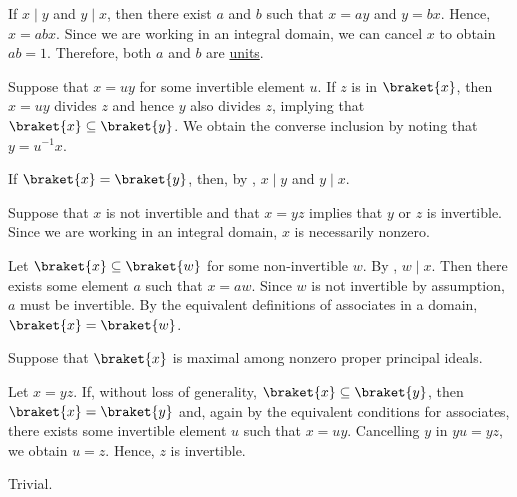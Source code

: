 \begin{defproof}
   If \( x \mid y \) and \( y \mid x \), then there exist \( a \) and \( b \) such that \( x = ay \) and \( y = bx \). Hence, \( x = abx \). Since we are working in an integral domain, we can cancel \( x \) to obtain \( ab = 1 \). Therefore, both \( a \) and \( b \) are \hyperref[def:divisibility/invertible]{units}.

   Suppose that \( x = uy \) for some invertible element \( u \). If \( z \) is in \( \braket{ x } \), then \( x = uy \) divides \( z \) and hence \( y \) also divides \( z \), implying that \( \braket{ x } \subseteq \braket{ y } \). We obtain the converse inclusion by noting that \( y = u^{-1} x \).

   If \( \braket{ x } = \braket{ y } \), then, by , \( x \mid y \) and \( y \mid x \).

   Suppose that \( x \) is not invertible and that \( x = yz \) implies that \( y \) or \( z \) is invertible. Since we are working in an integral domain, \( x \) is necessarily nonzero.

  Let \( \braket{ x } \subseteq \braket{ w } \) for some non-invertible \( w \). By , \( w \mid x \). Then there exists some element \( a \) such that \( x = aw \). Since \( w \) is not invertible by assumption, \( a \) must be invertible. By the equivalent definitions of associates in a domain, \( \braket{ x } = \braket{ w } \).

   Suppose that \( \braket{ x } \) is maximal among nonzero proper principal ideals.

  Let \( x = yz \). If, without loss of generality, \( \braket{ x } \subseteq \braket{ y } \), then \( \braket{ x } = \braket{ y } \) and, again by the equivalent conditions for associates, there exists some invertible element \( u \) such that \( x = uy \). Cancelling \( y \) in \( yu = yz \), we obtain \( u = z \). Hence, \( z \) is invertible.

   Trivial.
\end{defproof}

